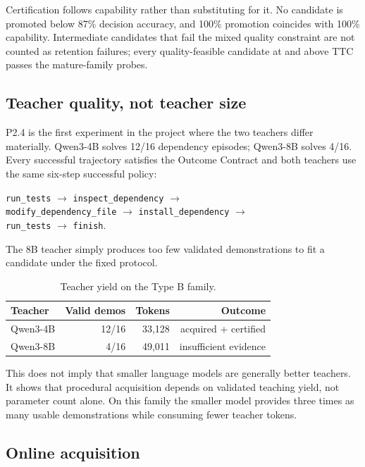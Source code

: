 \documentclass[10pt]{article}
\begin{document}
Certification follows capability rather than substituting for it. No candidate is promoted below 87\% decision accuracy, and 100\% promotion coincides with 100\% capability. Intermediate candidates that fail the mixed quality constraint are not counted as retention failures; every quality-feasible candidate at and above TTC passes the mature-family probes.

\subsection{Teacher quality, not teacher size}

P2.4 is the first experiment in the project where the two teachers differ materially. Qwen3-4B solves 12/16 dependency episodes; Qwen3-8B solves 4/16. Every successful trajectory satisfies the Outcome Contract and both teachers use the same six-step successful policy:
\begin{center}
\texttt{run\_tests} $\rightarrow$ \texttt{inspect\_dependency} $\rightarrow$\\
\texttt{modify\_dependency\_file} $\rightarrow$ \texttt{install\_dependency} $\rightarrow$\\
\texttt{run\_tests} $\rightarrow$ \texttt{finish}.
\end{center}
The 8B teacher simply produces too few validated demonstrations to fit a candidate under the fixed protocol.

\begin{table}[t]
\centering
\caption{Teacher yield on the Type B family.}
\label{tab:teachers}
\begin{tabular}{lrrr}
\toprule
Teacher & Valid demos & Tokens & Outcome \\
\midrule
Qwen3-4B & 12/16 & 33,128 & acquired + certified \\
Qwen3-8B & 4/16 & 49,011 & insufficient evidence \\
\bottomrule
\end{tabular}
\end{table}

This does not imply that smaller language models are generally better teachers. It shows that procedural acquisition depends on validated teaching yield, not parameter count alone. On this family the smaller model provides three times as many usable demonstrations while consuming fewer teacher tokens.

\subsection{Online acquisition}
\end{document}
